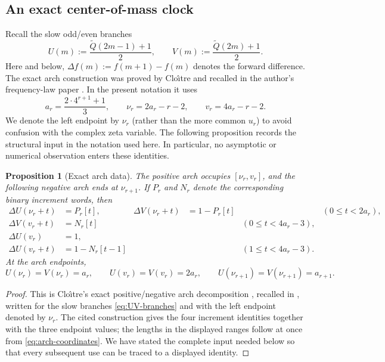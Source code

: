 \documentclass[11pt]{article}
\newtheorem{proposition}[theorem]{Proposition}
\theoremstyle{definition}
\theoremstyle{remark}
\newcommand{\Qp}{\widetilde Q}
\begin{document}
\subsection{An exact center-of-mass clock}

Recall the slow odd/even branches
\begin{equation}
U(m):=\frac{\Qp(2m-1)+1}{2},
\qquad
V(m):=\frac{\Qp(2m)+1}{2}.
\label{eq:UV-branches}
\end{equation}
Here and below, \(\Delta f(m):=f(m+1)-f(m)\) denotes the forward
difference.  The exact arch construction was proved by Clo\^{\i}tre
\cite{Cloitre2026} and recalled in the author's frequency-law paper
\cite[Eqs.~(11)--(19)]{Mantovanelli2026Frequency}.  In the present notation
it uses
\begin{equation}
a_r=\frac{2\cdot4^{r+1}+1}{3},
\qquad
\nu_r=2a_r-r-2,
\qquad
v_r=4a_r-r-2.
\label{eq:arch-coordinates}
\end{equation}
We denote the left endpoint by \(\nu_r\) (rather than the more common
\(u_r\)) to avoid confusion with the complex zeta variable.
The following proposition records the structural input in the notation used
here.  In particular, no asymptotic or numerical observation enters these
identities.

\begin{proposition}[Exact arch data]
\label{prop:exact-arch-data}
The positive arch occupies \([\nu_r,v_r]\), and the following negative arch
ends at \(\nu_{r+1}\).  If \(P_r\) and \(N_r\) denote the corresponding
binary increment words, then
\begin{align}
\Delta U(\nu_r+t)&=P_r[t],
&\Delta V(\nu_r+t)&=1-P_r[t]
&& (0\le t<2a_r),
\label{eq:positive-increments}\\
\Delta V(v_r+t)&=N_r[t]
&&& (0\le t<4a_r-3),
\label{eq:negative-V}\\
\Delta U(v_r)&=1,
\label{eq:negative-U-first}\\
\Delta U(v_r+t)&=1-N_r[t-1]
&&& (1\le t<4a_r-3).
\label{eq:negative-U}
\end{align}
At the arch endpoints,
\begin{equation}
U(\nu_r)=V(\nu_r)=a_r,
\qquad
U(v_r)=V(v_r)=2a_r,
\qquad
U(\nu_{r+1})=V(\nu_{r+1})=a_{r+1}.
\label{eq:arch-endpoints}
\end{equation}
\end{proposition}

\begin{proof}
This is Clo\^{\i}tre's exact positive/negative arch decomposition
\cite{Cloitre2026}, recalled in
\cite[Eqs.~(11)--(19)]{Mantovanelli2026Frequency}, written for the slow
branches \eqref{eq:UV-branches} and with the left endpoint denoted by
\(\nu_r\).
The cited construction gives the four increment identities together with
the three endpoint values; the lengths in the displayed ranges follow at
once from \eqref{eq:arch-coordinates}.  We have stated the complete input
needed below so that every subsequent use can be traced to a displayed
identity.
\end{proof}
\end{document}
